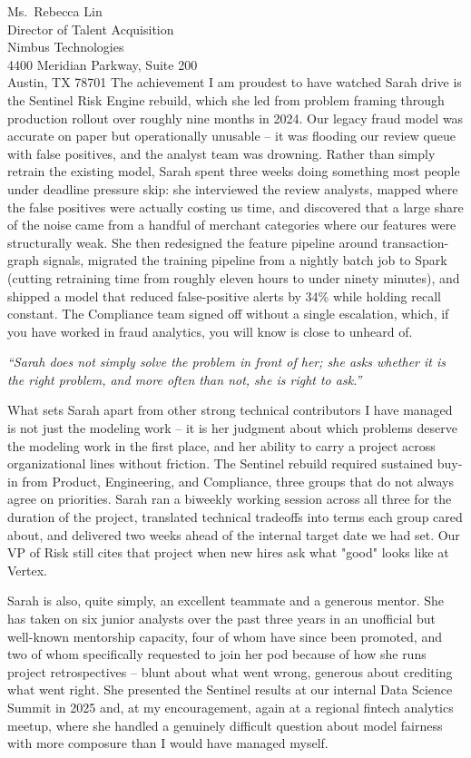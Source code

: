 \documentclass[11pt]{letter}
\begin{document}
\begin{letter}{Ms.\ Rebecca Lin\\ Director of Talent Acquisition\\ Nimbus Technologies\\ 4400 Meridian Parkway, Suite 200\\ Austin, TX 78701}
The achievement I am proudest to have watched Sarah drive is the Sentinel Risk Engine rebuild, which she led from problem framing through production rollout over roughly nine months in 2024. Our legacy fraud model was accurate on paper but operationally unusable -- it was flooding our review queue with false positives, and the analyst team was drowning. Rather than simply retrain the existing model, Sarah spent three weeks doing something most people under deadline pressure skip: she interviewed the review analysts, mapped where the false positives were actually costing us time, and discovered that a large share of the noise came from a handful of merchant categories where our features were structurally weak. She then redesigned the feature pipeline around transaction-graph signals, migrated the training pipeline from a nightly batch job to Spark (cutting retraining time from roughly eleven hours to under ninety minutes), and shipped a model that reduced false-positive alerts by 34\% while holding recall constant. The Compliance team signed off without a single escalation, which, if you have worked in fraud analytics, you will know is close to unheard of.

\begin{tcolorbox}[
  enhanced,
  colback=paleblue,
  colframe=paleblue,
  borderline west={3pt}{0pt}{gold},
  boxrule=0pt,
  left=14pt,right=14pt,top=8pt,bottom=8pt
]
\itshape\color{navy}
``Sarah does not simply solve the problem in front of her; she asks whether it is the right problem, and more often than not, she is right to ask.''
\end{tcolorbox}

What sets Sarah apart from other strong technical contributors I have managed is not just the modeling work -- it is her judgment about which problems deserve the modeling work in the first place, and her ability to carry a project across organizational lines without friction. The Sentinel rebuild required sustained buy-in from Product, Engineering, and Compliance, three groups that do not always agree on priorities. Sarah ran a biweekly working session across all three for the duration of the project, translated technical tradeoffs into terms each group cared about, and delivered two weeks ahead of the internal target date we had set. Our VP of Risk still cites that project when new hires ask what "good" looks like at Vertex.

Sarah is also, quite simply, an excellent teammate and a generous mentor. She has taken on six junior analysts over the past three years in an unofficial but well-known mentorship capacity, four of whom have since been promoted, and two of whom specifically requested to join her pod because of how she runs project retrospectives -- blunt about what went wrong, generous about crediting what went right. She presented the Sentinel results at our internal Data Science Summit in 2025 and, at my encouragement, again at a regional fintech analytics meetup, where she handled a genuinely difficult question about model fairness with more composure than I would have managed myself.


\end{letter}
\end{document}
